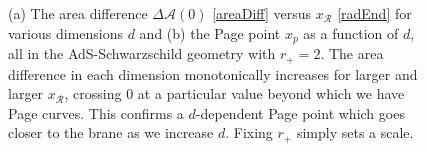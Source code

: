 \begin{figure}
\centering
{}
\quad
{}
\quad
{}
\caption{(a) The area difference $\Delta\mathcal{A}(0)$ \eqref{areaDiff} versus $x_\mathcal{R}$ \eqref{radEnd} for various dimensions $d$ and (b) the Page point $x_p$ as a function of $d$, all in the AdS-Schwarzschild geometry with $r_+ = 2$. The area difference in each dimension monotonically increases for larger and larger $x_\mathcal{R}$, crossing $0$ at a particular value beyond which we have Page curves. This confirms a $d$-dependent Page point which goes closer to the brane as we increase $d$. Fixing $r_+$ simply sets a scale.}
\label{figs:pagePointAS}
\end{figure}